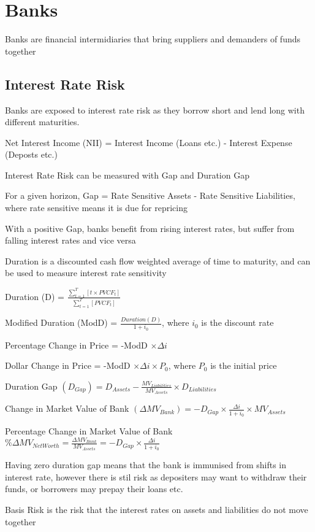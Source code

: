 \section{Banks}
Banks are financial intermidiaries that bring suppliers and demanders of funds
together

\subsection{Interest Rate Risk}
Banks are exposed to interest rate risk as they borrow short and lend long with different maturities.

Net Interest Income (NII) = Interest Income (Loans etc.) - Interest Expense (Deposts etc.)

Interest Rate Risk can be measured with Gap and Duration Gap

For a given horizon, Gap = Rate Sensitive Assets - Rate Sensitive Liabilities, where rate sensitive means it is due for repricing

With a positive Gap, banks benefit from rising interest rates, but suffer from falling interest rates and vice versa

Duration is a discounted cash flow weighted average  of time to maturity, and can be used to measure interest rate sensitivity

Duration (D) = $\frac{\sum^{T}_{t=1}{[t \times PVCF_t]}}{\sum^{T}_{t=1}{[PVCF_t]}}$

Modified Duration (ModD) = $\frac{Duration (D)}{1 + i_0}$, where $i_0$ is the discount rate

Percentage Change in Price = -ModD $\times \Delta i$

Dollar Change in Price = -ModD $\times \Delta i \times P_0$, where $P_0$ is the initial price

Duration Gap $(D_{Gap}) = D_{Assets} - \frac{MV_{Liabilities}}{MV_{Assets}} \times D_{Liabilities}$

Change in Market Value of Bank $(\Delta MV_{Bank}) = -D_{Gap} \times \frac{\Delta i}{1 + i_0} \times MV_{Assets}$

Percentage Change in Market Value of Bank $\%\Delta MV_{Net Worth} = \frac{\Delta MV_{Bank}}{MV_{Assets}} = -D_{Gap} \times \frac{\Delta i}{1 + i_0}$

Having zero duration gap means that the bank is immunised from shifts in interest rate, however there is stil risk as depositers may want to 
withdraw their funds, or borrowers may prepay their loans etc.

Basis Risk is the risk that the interest rates on assets and liabilities do not move together

